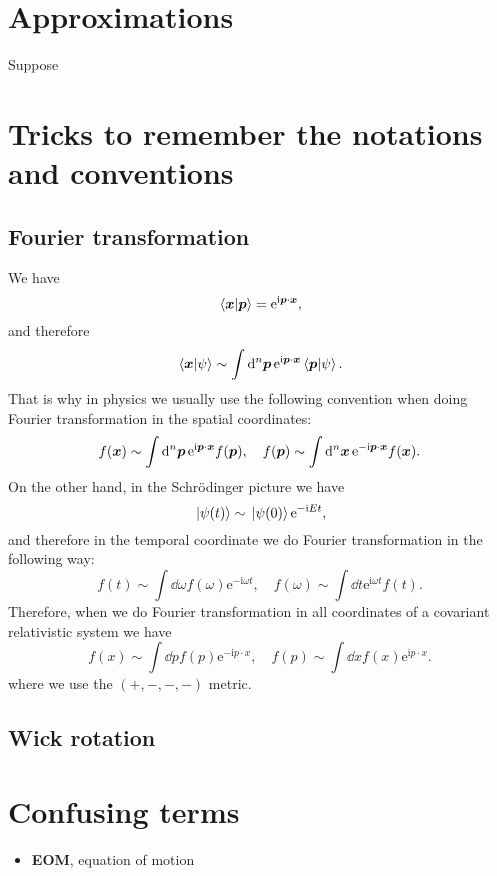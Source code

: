 \documentclass[hyperref, a4paper]{article}
\newcommand*{\ii}{\mathrm{i}}
\newcommand*{\ee}{\mathrm{e}}
\newcommand*{\concept}[1]{{\textbf{#1}}}
\begin{document}
\section{Approximations}

Suppose 

\section{Tricks to remember the notations and conventions}

\subsection{Fourier transformation}

We have 
\[
    \braket*{\vb*{x}}{\vb*{p}} = \ee^{\ii \vb*{p} \cdot \vb*{x}},
\]
and therefore 
\[
    \braket*{\vb*{x}}{\psi} \sim \int \dd[n]{\vb*{p}} \ee^{\ii \vb*{p} \cdot \vb*{x}} \braket*{\vb*{p}}{\psi}.
\]
That is why in physics we usually use the following convention when doing Fourier transformation in the spatial coordinates:
\begin{equation}
    f(\vb*{x}) \sim \int \dd[n]{\vb*{p}} \ee^{\ii \vb*{p} \cdot \vb*{x}} f(\vb*{p}), \quad f(\vb*{p}) \sim \int \dd[n]{\vb*{x}} \ee^{- \ii \vb*{p} \cdot \vb*{x}} f(\vb*{x}).
\end{equation}
On the other hand, in the Schrödinger picture we have 
\[
    \ket*{\psi(t)} \sim \ket*{\psi(0)} \ee^{- \ii E t},
\]
and therefore in the temporal coordinate we do Fourier transformation in the following way:
\begin{equation}
    f(t) \sim \int \dd{\omega} f(\omega) \ee^{- \ii \omega t}, \quad f(\omega) \sim \int \dd{t} \ee^{\ii \omega t} f(t).
\end{equation}
Therefore, when we do Fourier transformation in all coordinates of a covariant relativistic system we have 
\begin{equation}
    f(x) \sim \int \dd{p} f(p) \ee^{- \ii p \cdot x}, \quad f(p) \sim \int \dd{x} f(x) \ee^{\ii p \cdot x}.
\end{equation}
where we use the $(+, -, -, -)$ metric.

\subsection{Wick rotation}

\section{Confusing terms}

\begin{itemize}
    \item \concept{EOM}, equation of motion
\end{itemize}


 
\end{document}
